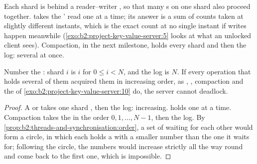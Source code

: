 \label{lst:b2:project-key-value-server:sharded}

Each shard is behind a reader--writer , so that many s on one shard also proceed together. 
takes the ' read  one at a time; its answer is a sum of counts taken at slightly different instants, which
is the exact count at no single instant if writes happen meanwhile (\cref{exo:b2:project-key-value-server:5} looks at
what an unlocked client sees). Compaction, in the next milestone, holds every shard and then the log: several  at
once.

\begin{proposition}\label{prop:b2:project-key-value-server:lock-order}
Number the : shard $i$ is  $i$ for $0 \le i < N$, and the log is  $N$. If every operation that holds several
of them acquired them in increasing order, as , , compaction and the  of
\cref{exo:b2:project-key-value-server:10} do, the server cannot deadlock.
\end{proposition}

\begin{proof}
A  or  takes one shard , then the log: increasing.  holds one  at a time.
Compaction takes the  in the order $0, 1, \dots, N-1$, then the log. By \cref{prop:b2:threads-and-synchronisation:order},
a set of  waiting for each other would form a circle, in which each  holds a  with a smaller number than
the one it waits for; following the circle, the numbers would increase strictly all the way round and come back to the
first one, which is impossible.
\end{proof}

